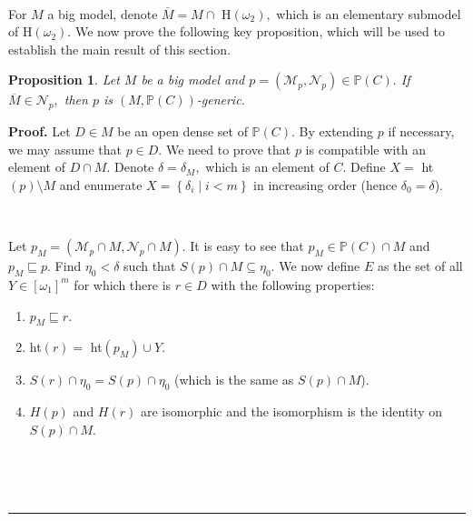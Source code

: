 \documentclass{article}
\newtheorem{proposition}[theorem]{Proposition}
\newenvironment{proof}[1][Proof]{\noindent\textbf{#1.} }{\ \rule{0.5em}{0.5em}}
\begin{document}
\qquad\ \qquad\ \ \qquad\ \ \ 

For $M$ a big model, denote $\overline{M}=M\cap$ \textsf{H}$\left(  \omega
_{2}\right)  ,$ which is an elementary submodel of \textsf{H}$\left(
\omega_{2}\right)  .$ We now prove the following key proposition, which will
be used to establish the main result of this section.

\begin{proposition}
Let $M$ be a big model and $p=(\mathcal{M}_{p},\mathcal{N}_{p})\in
\mathbb{P}\left(  C\right)  .$ If $\overline{M}\in\mathcal{N}_{p},$ then $p$
is $(M,\mathbb{P}\left(  C\right)  )$-generic. \label{Prop Can Proper reales}
\end{proposition}

\begin{proof}
Let $D\in M$ be an open dense set of $\mathbb{P}\left(  C\right)  $. By
extending $p$ if necessary, we may assume that $p\in D.$ We need to prove that
$p$ is compatible with an element of $D\cap M.$ Denote $\delta=\delta_{M},$
which is an element of $C.$ Define $X=$ \textsf{ht}$\left(  p\right)
\setminus M$ and enumerate $X=\left\{  \delta_{i}\mid i<m\right\}  $ in
increasing order (hence $\delta_{0}=\delta$).

\qquad\ \qquad\ \qquad\ \qquad\ \ 

Let $p_{M}=(\mathcal{M}_{p}\cap M,\mathcal{N}_{p}\cap M).$ It is easy to see
that $p_{M}\in\mathbb{P}\left(  C\right)  \cap M$ and $p_{M}\sqsubseteq p.$
Find $\eta_{0}<\delta$ such that $S\left(  p\right)  \cap M\subseteq\eta_{0}.$
We now define $E$ as the set of all $Y\in\left[  \omega_{1}\right]  ^{m}$ for
which there is $r\in D$ with the following properties:

\begin{enumerate}
\item $p_{M}\sqsubseteq r.$

\item \textsf{ht}$\left(  r\right)  =$ \textsf{ht}$\left(  p_{M}\right)  \cup
Y.$

\item $S\left(  r\right)  \cap\eta_{0}=S\left(  p\right)  \cap\eta_{0}$ (which
is the same as $S\left(  p\right)  \cap M$).

\item $H\left(  p\right)  $ and $H\left(  r\right)  $ are isomorphic and the
isomorphism is the identity on $S\left(  p\right)  \cap M.$
\end{enumerate}

\qquad\ \ \ 


\end{proof}
\end{document}

